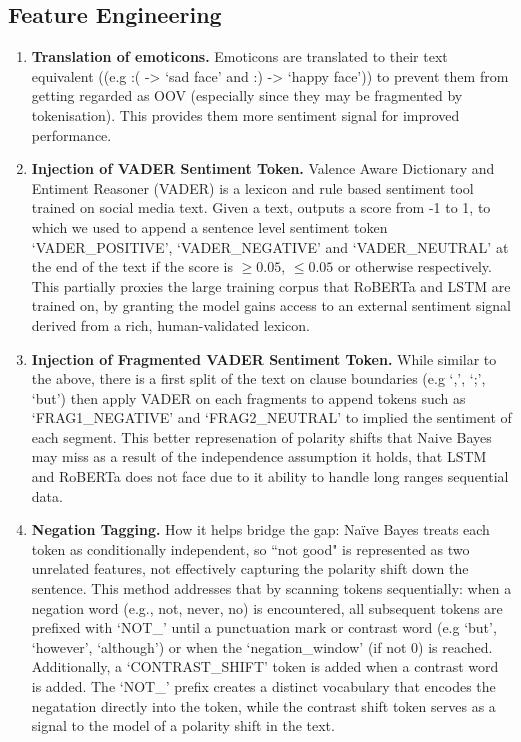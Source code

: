 \documentclass[11pt]{article}
\begin{document}
\subsection{Feature Engineering}
\begin{enumerate}
    \item \textbf{Translation of emoticons.} Emoticons are translated to their text equivalent ((e.g :( -> `sad face' and :) -> `happy face')) to prevent them from getting regarded as OOV (especially since they may be fragmented by tokenisation). This provides them more sentiment signal for improved performance.
    \item \textbf{Injection of VADER Sentiment Token.} Valence Aware Dictionary and Entiment Reasoner (VADER) \citep{hutto-2014} is a lexicon and rule based sentiment tool trained on social media text. Given a text, outputs a score from -1 to 1, to which we used to append a sentence level sentiment token `VADER\_POSITIVE', `VADER\_NEGATIVE' and `VADER\_NEUTRAL' at the end of the text if the score is \(\geq 0.05 \), \(\leq 0.05 \) or otherwise respectively. 
    This partially proxies the large training corpus that RoBERTa and LSTM are trained on, by granting the model gains access to an external sentiment signal derived from a rich, human-validated lexicon.
    \item \textbf{Injection of Fragmented VADER Sentiment Token.} While similar to the above, there is a first split of the text on clause boundaries (e.g `,', `;', `but') then apply VADER on each fragments to append tokens such as `FRAG1\_NEGATIVE' and `FRAG2\_NEUTRAL' to implied the sentiment of each segment. This better represenation of polarity shifts that Naive Bayes may miss as a result of the independence assumption it holds, that LSTM and RoBERTa does not face due to it ability to handle long ranges sequential data. 
    \item \textbf{Negation Tagging.} How it helps bridge the gap: Naïve Bayes treats each token as conditionally independent, so ``not good" is represented as two unrelated features, not effectively capturing the polarity shift down the sentence. This method addresses that by scanning tokens sequentially: when a negation word (e.g., not, never, no) is encountered, all subsequent tokens are prefixed with `NOT\_' until a punctuation mark or contrast word (e.g `but', `however', `although') or when the `negation\_window' (if not 0) is reached. 
    Additionally, a `CONTRAST\_SHIFT' token is added when a contrast word is added. The `NOT\_' prefix creates a distinct vocabulary that encodes the negatation directly into the token, while the contrast shift token serves as a signal to the model of a polarity shift in the text.

\end{enumerate}
\end{document}
